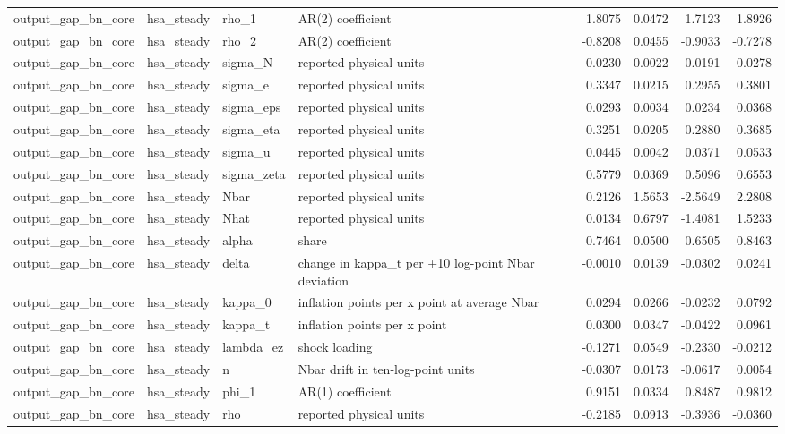 \begin{tabular}{llllrrrr}
output\_gap\_bn\_core & hsa\_steady & rho\_1 & AR(2) coefficient & 1.8075 & 0.0472 & 1.7123 & 1.8926 \\
output\_gap\_bn\_core & hsa\_steady & rho\_2 & AR(2) coefficient & -0.8208 & 0.0455 & -0.9033 & -0.7278 \\
output\_gap\_bn\_core & hsa\_steady & sigma\_N & reported physical units & 0.0230 & 0.0022 & 0.0191 & 0.0278 \\
output\_gap\_bn\_core & hsa\_steady & sigma\_e & reported physical units & 0.3347 & 0.0215 & 0.2955 & 0.3801 \\
output\_gap\_bn\_core & hsa\_steady & sigma\_eps & reported physical units & 0.0293 & 0.0034 & 0.0234 & 0.0368 \\
output\_gap\_bn\_core & hsa\_steady & sigma\_eta & reported physical units & 0.3251 & 0.0205 & 0.2880 & 0.3685 \\
output\_gap\_bn\_core & hsa\_steady & sigma\_u & reported physical units & 0.0445 & 0.0042 & 0.0371 & 0.0533 \\
output\_gap\_bn\_core & hsa\_steady & sigma\_zeta & reported physical units & 0.5779 & 0.0369 & 0.5096 & 0.6553 \\
output\_gap\_bn\_core & hsa\_steady & Nbar & reported physical units & 0.2126 & 1.5653 & -2.5649 & 2.2808 \\
output\_gap\_bn\_core & hsa\_steady & Nhat & reported physical units & 0.0134 & 0.6797 & -1.4081 & 1.5233 \\
output\_gap\_bn\_core & hsa\_steady & alpha & share & 0.7464 & 0.0500 & 0.6505 & 0.8463 \\
output\_gap\_bn\_core & hsa\_steady & delta & change in kappa\_t per +10 log-point Nbar deviation & -0.0010 & 0.0139 & -0.0302 & 0.0241 \\
output\_gap\_bn\_core & hsa\_steady & kappa\_0 & inflation points per x point at average Nbar & 0.0294 & 0.0266 & -0.0232 & 0.0792 \\
output\_gap\_bn\_core & hsa\_steady & kappa\_t & inflation points per x point & 0.0300 & 0.0347 & -0.0422 & 0.0961 \\
output\_gap\_bn\_core & hsa\_steady & lambda\_ez & shock loading & -0.1271 & 0.0549 & -0.2330 & -0.0212 \\
output\_gap\_bn\_core & hsa\_steady & n & Nbar drift in ten-log-point units & -0.0307 & 0.0173 & -0.0617 & 0.0054 \\
output\_gap\_bn\_core & hsa\_steady & phi\_1 & AR(1) coefficient & 0.9151 & 0.0334 & 0.8487 & 0.9812 \\
output\_gap\_bn\_core & hsa\_steady & rho & reported physical units & -0.2185 & 0.0913 & -0.3936 & -0.0360 \\

\end{tabular}
